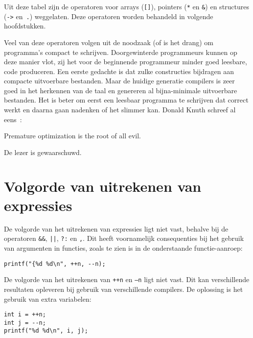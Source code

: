 Uit deze tabel zijn de operatoren voor arrays (\texttt{[]}), pointers (\texttt{*} en \texttt{\&}) en structures (\texttt{->} en~\texttt{.}) weggelaten. Deze operatoren worden behandeld in volgende hoofdstukken.

Veel van deze operatoren volgen uit de noodzaak (of is het drang) om programma's compact te schrijven. Doorgewinterde programmeurs kunnen op deze manier vlot, zij het voor de beginnende programmeur minder goed leesbare, code produceren. Een eerste gedachte is dat zulke constructies bijdragen aan compacte uitvoerbare bestanden. Maar de huidige generatie compilers is zeer goed in het herkennen van de taal en genereren al bijna-minimale uitvoerbare bestanden. Het is beter om eerst een leesbaar programma te schrijven dat correct werkt en daarna gaan nadenken of het slimmer kan.
Donald Knuth schreef al eens~\cite{knuth1974}:

\begin{displayquote}
Premature optimization is the root of all evil.
\end{displayquote}
De lezer is gewaarschuwd.

\section{Volgorde van uit\textsl{}rekenen van expressies}
De volgorde van het uitrekenen van expressies ligt niet vast, behalve bij de operatoren \texttt{\&\&}, \texttt{||}, \texttt{?:} en \texttt{,}. Dit heeft voornamelijk consequenties bij het gebruik van argumenten in functies, zoals te zien is in de onderstaande functie-aanroep:

\begin{lstlisting}[style=lstoneline]
printf("{%d %d\n", ++n, --n);
\end{lstlisting}

De volgorde van het uitrekenen van \texttt{++n} en \texttt{--n} ligt niet vast. Dit kan verschillende resultaten opleveren bij gebruik van verschillende compilers. De oplossing is het gebruik van extra variabelen:

\begin{lstlisting}[style=lstoneline]
int i = ++n;
int j = --n;
printf("%d %d\n", i, j);
\end{lstlisting}